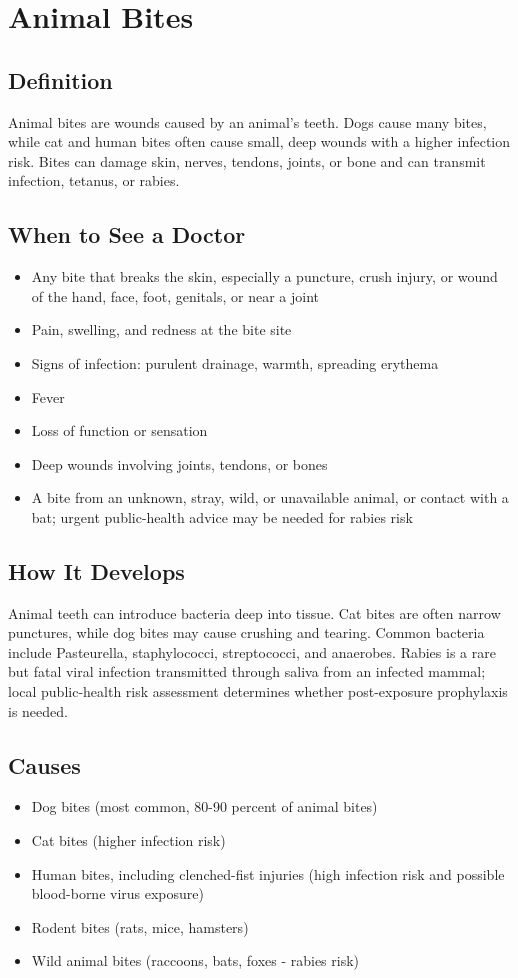 \chapter{Animal Bites}

\section*{Definition}
Animal bites are wounds caused by an animal's teeth. Dogs cause many bites, while cat and human bites often cause small, deep wounds with a higher infection risk. Bites can damage skin, nerves, tendons, joints, or bone and can transmit infection, tetanus, or rabies.

\section*{When to See a Doctor}
\begin{itemize}
\item Any bite that breaks the skin, especially a puncture, crush injury, or wound of the hand, face, foot, genitals, or near a joint
\item Pain, swelling, and redness at the bite site
\item Signs of infection: purulent drainage, warmth, spreading erythema
\item Fever
\item Loss of function or sensation
\item Deep wounds involving joints, tendons, or bones
\item A bite from an unknown, stray, wild, or unavailable animal, or contact with a bat; urgent public-health advice may be needed for rabies risk
\end{itemize}

\section*{How It Develops}
Animal teeth can introduce bacteria deep into tissue. Cat bites are often narrow punctures, while dog bites may cause crushing and tearing. Common bacteria include Pasteurella, staphylococci, streptococci, and anaerobes. Rabies is a rare but fatal viral infection transmitted through saliva from an infected mammal; local public-health risk assessment determines whether post-exposure prophylaxis is needed.

\section*{Causes}
\begin{itemize}
\item Dog bites (most common, 80-90 percent of animal bites)
\item Cat bites (higher infection risk)
\item Human bites, including clenched-fist injuries (high infection risk and possible blood-borne virus exposure)
\item Rodent bites (rats, mice, hamsters)
\item Wild animal bites (raccoons, bats, foxes - rabies risk)
\end{itemize}

